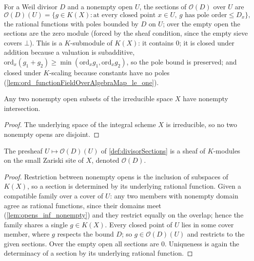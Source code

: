 \begin{definition}
  \label{def:divisorSections}
  \leanok
  For a Weil divisor \(D\) and a nonempty open \(U\), the sections of \(\mathcal O(D)\) over \(U\)
  are
  \[
    \mathcal O(D)(U) = \{ g \in K(X) : \text{at every closed point } x \in U,\ g \text{ has pole
      order} \le D_x \},
  \]
  the rational functions with poles bounded by \(D\) on \(U\); over the empty open the sections are
  the zero module (forced by the sheaf condition, since the empty sieve covers \(\bot\)). This is a
  \(K\)-submodule of \(K(X)\): it contains \(0\); it is closed under addition because a valuation is
  subadditive, \(\mathrm{ord}_x(g_1 + g_2) \ge \min(\mathrm{ord}_x g_1, \mathrm{ord}_x g_2)\), so
  the pole bound is preserved; and closed under \(K\)-scaling because constants have no poles
  (\ref{lem:ord_functionFieldOverAlgebraMap_le_one}).
\end{definition}

\begin{lemma}
  \label{lem:opens_inf_nonempty}
  \leanok
  Any two nonempty open subsets of the irreducible space \(X\) have nonempty intersection.
\end{lemma}
\begin{proof}
  \leanok
  The underlying space of the integral scheme \(X\) is irreducible, so no two nonempty opens are
  disjoint.
\end{proof}

\begin{definition}
  \label{def:divisorSheaf}
  \leanok
  The presheaf \(U \mapsto \mathcal O(D)(U)\) of \ref{def:divisorSections} is a sheaf of
  \(K\)-modules on the small Zariski site of \(X\), denoted \(\mathcal O(D)\).
\end{definition}
\begin{proof}
  \leanok
  Restriction between nonempty opens is the inclusion of subspaces of \(K(X)\), so a section is
  determined by its underlying rational function. Given a compatible family over a cover of \(U\):
  any two members with nonempty domain agree as rational functions, since their domains meet
  (\ref{lem:opens_inf_nonempty}) and they restrict equally on the overlap; hence the family shares a
  single \(g \in K(X)\). Every closed point of \(U\) lies in some cover member, where \(g\) respects
  the bound \(D\); so \(g \in \mathcal O(D)(U)\) and restricts to the given sections. Over the empty
  open all sections are \(0\). Uniqueness is again the determinacy of a section by its underlying
  rational function.
\end{proof}

